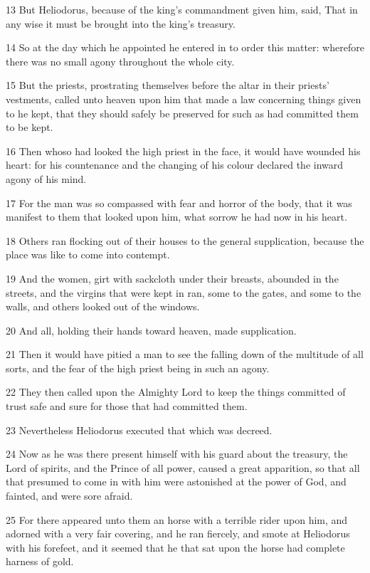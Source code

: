 \par 13 But Heliodorus, because of the king's commandment given him, said, That in any wise it must be brought into the king's treasury.
\par 14 So at the day which he appointed he entered in to order this matter: wherefore there was no small agony throughout the whole city.
\par 15 But the priests, prostrating themselves before the altar in their priests' vestments, called unto heaven upon him that made a law concerning things given to he kept, that they should safely be preserved for such as had committed them to be kept.
\par 16 Then whoso had looked the high priest in the face, it would have wounded his heart: for his countenance and the changing of his colour declared the inward agony of his mind.
\par 17 For the man was so compassed with fear and horror of the body, that it was manifest to them that looked upon him, what sorrow he had now in his heart.
\par 18 Others ran flocking out of their houses to the general supplication, because the place was like to come into contempt.
\par 19 And the women, girt with sackcloth under their breasts, abounded in the streets, and the virgins that were kept in ran, some to the gates, and some to the walls, and others looked out of the windows.
\par 20 And all, holding their hands toward heaven, made supplication.
\par 21 Then it would have pitied a man to see the falling down of the multitude of all sorts, and the fear of the high priest being in such an agony.
\par 22 They then called upon the Almighty Lord to keep the things committed of trust safe and sure for those that had committed them.
\par 23 Nevertheless Heliodorus executed that which was decreed.
\par 24 Now as he was there present himself with his guard about the treasury, the Lord of spirits, and the Prince of all power, caused a great apparition, so that all that presumed to come in with him were astonished at the power of God, and fainted, and were sore afraid.
\par 25 For there appeared unto them an horse with a terrible rider upon him, and adorned with a very fair covering, and he ran fiercely, and smote at Heliodorus with his forefeet, and it seemed that he that sat upon the horse had complete harness of gold.
